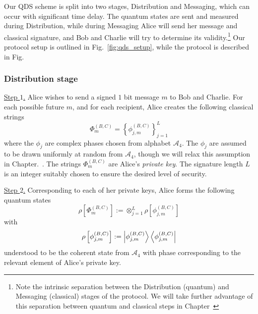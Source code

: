 Our QDS scheme is split into two stages, Distribution and Messaging, which can occur with significant time delay. The quantum states are sent and measured during Distribution, while during Messaging Alice will send her message and classical signature, and Bob and Charlie will try to determine its validity.\footnote{Note the intrinsic separation between the Distribution (quantum) and Messaging (classical) stages of the protocol. We will take further advantage of this separation between quantum and classical steps in Chapter~} Our protocol setup is outlined in Fig.~\ref{fig:qds_setup}, while the protocol is described in Fig.~ 





\subsubsection{Distribution stage}
\noindent \underline{Step $1$.} Alice wishes to send a signed $1$ bit message $m$ to Bob and Charlie. For each possible future $m$, and for each recipient, Alice creates the following classical strings
\begin{equation}
\Phi_m^{\left(B, C\right)} = \left\{ \phi_{j, m}^{\left(B, C\right)}\right\}_{j=1}^{L}
\end{equation}
where the $\phi_{j}$ are complex phases chosen from alphabet $\mathcal{A}_4$. The $\phi_j$ are assumed to be drawn uniformly at random from $\mathcal{A}_4$, though we will relax this assumption in Chapter.~. The strings $\Phi_m^{\left(B, C\right)}$ are Alice's \emph{private key}.  The signature length $L$ is an integer suitably chosen to ensure the desired level of security.
\par
\noindent \underline{Step $2$.} Corresponding to each of her private keys, Alice forms the following quantum states
\begin{equation}\label{eqn:QDS_publickey}
\rho\left[\Phi_m^{\left(B, C\right)}\right] := \otimes_{j=1}^L \rho\left[\phi_{j, m}^{\left(B, C\right)}\right]
\end{equation}
with
\begin{equation}
\rho\left[\phi_{j, m}^{\left(B, C\right)}\right] := \ket{\phi_{j, m}^{\left(B, C\right)}} \bra{\phi_{j, m}^{\left(B, C\right)}}
\end{equation}
understood to be the coherent state from $\mathcal{A}_4$ with phase corresponding to the relevant element of Alice's private key.

